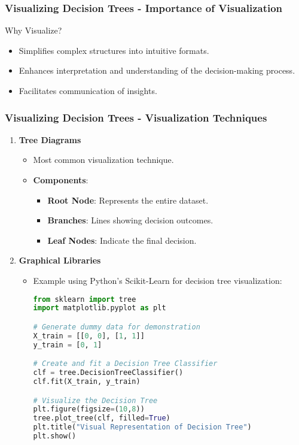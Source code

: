 \documentclass[aspectratio=169]{beamer}
\begin{document}
\begin{frame}[fragile]
    \frametitle{Visualizing Decision Trees - Importance of Visualization}
    \begin{block}{Why Visualize?}
        \begin{itemize}
            \item Simplifies complex structures into intuitive formats.
            \item Enhances interpretation and understanding of the decision-making process.
            \item Facilitates communication of insights.
        \end{itemize}
    \end{block}
\end{frame}

\begin{frame}[fragile]
    \frametitle{Visualizing Decision Trees - Visualization Techniques}
    \begin{enumerate}
        \item \textbf{Tree Diagrams}
            \begin{itemize}
                \item Most common visualization technique.
                \item \textbf{Components}:
                    \begin{itemize}
                        \item \textbf{Root Node}: Represents the entire dataset.
                        \item \textbf{Branches}: Lines showing decision outcomes.
                        \item \textbf{Leaf Nodes}: Indicate the final decision.
                    \end{itemize}
            \end{itemize}
        \item \textbf{Graphical Libraries}
            \begin{itemize}
                \item Example using Python's Scikit-Learn for decision tree visualization:
                \begin{lstlisting}[language=Python]
from sklearn import tree
import matplotlib.pyplot as plt

# Generate dummy data for demonstration
X_train = [[0, 0], [1, 1]]
y_train = [0, 1]

# Create and fit a Decision Tree Classifier
clf = tree.DecisionTreeClassifier()
clf.fit(X_train, y_train)

# Visualize the Decision Tree
plt.figure(figsize=(10,8))
tree.plot_tree(clf, filled=True)
plt.title("Visual Representation of Decision Tree")
plt.show()
                \end{lstlisting}
            \end{itemize}
    \end{enumerate}
\end{frame}
\end{document}
